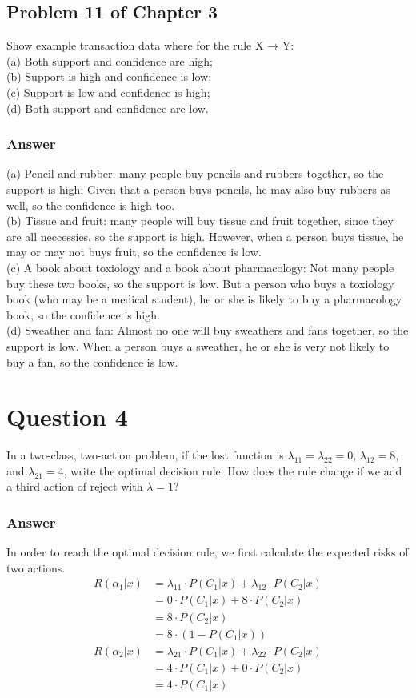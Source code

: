\documentclass{article}
\begin{document}
\subsection*{Problem 11 of Chapter 3}
Show example transaction data where for the rule X → Y:\\
(a) Both support and confidence are high;\\
(b) Support is high and confidence is low;\\
(c) Support is low and confidence is high;\\ 
(d) Both support and confidence are low.
\subsubsection*{Answer}
(a) Pencil and rubber: many people buy pencils and rubbers together, so the support is high; Given that a person buys pencils, he may also buy rubbers as well, so the confidence is high too.\\
(b) Tissue and fruit: many people will buy tissue and fruit together, since they are all neccessies, so the support is high. However, when a person buys tissue, he may or may not buys fruit, so the confidence is low.\\
(c) A book about toxiology and a book about pharmacology: Not many people buy these two books, so the support is low. But a person who buys a toxiology book (who may be a medical student), he or she is likely to buy a pharmacology book, so the confidence is high. \\
(d) Sweather and fan: Almost no one will buy sweathers and fans together, so the support is low. When a person buys a sweather, he or she is very not likely to buy a fan, so the confidence is low.


\section*{Question 4}
In a two-class, two-action problem, if the lost function is $\lambda_{11}=\lambda_{22}=0$, $\lambda_{12}=8$, and $\lambda_{21}=4$, write 
the optimal decision rule. How does the rule change if we add a third action of reject with $\lambda = 1$?
\subsubsection*{Answer}
In order to reach the optimal decision rule, we first calculate the expected risks of two actions.
\begin{align*}
R(\alpha_1|x) &=\lambda_{11}\cdot P(C_1|x) +  \lambda_{12}\cdot P(C_2|x)\\
&=0\cdot P(C_1|x) + 8\cdot P(C_2|x)\\
&= 8\cdot P(C_2|x)\\
&= 8\cdot(1-P(C_1|x))
\end{align*}
\begin{align*}
    R(\alpha_2|x) &=\lambda_{21}\cdot P(C_1|x) +  \lambda_{22}\cdot P(C_2|x)\\
    &=4\cdot P(C_1|x) + 0\cdot P(C_2|x)\\
    &= 4\cdot P(C_1|x)
\end{align*}
\end{document}
